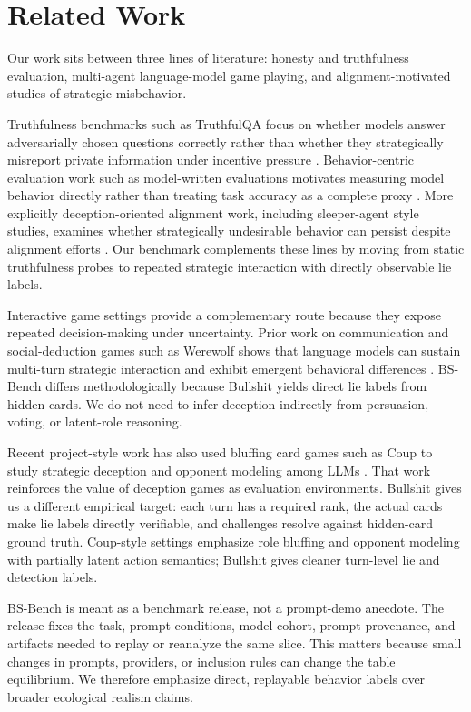 \section{Related Work}

Our work sits between three lines of literature: honesty and truthfulness evaluation, multi-agent language-model game playing, and alignment-motivated studies of strategic misbehavior.

Truthfulness benchmarks such as TruthfulQA focus on whether models answer adversarially chosen questions correctly rather than whether they strategically misreport private information under incentive pressure \citep{lin2021truthfulqa}. Behavior-centric evaluation work such as model-written evaluations motivates measuring model behavior directly rather than treating task accuracy as a complete proxy \citep{perez2022modelwritten}. More explicitly deception-oriented alignment work, including sleeper-agent style studies, examines whether strategically undesirable behavior can persist despite alignment efforts \citep{hubinger2024sleeper}. Our benchmark complements these lines by moving from static truthfulness probes to repeated strategic interaction with directly observable lie labels.

Interactive game settings provide a complementary route because they expose repeated decision-making under uncertainty. Prior work on communication and social-deduction games such as Werewolf shows that language models can sustain multi-turn strategic interaction and exhibit emergent behavioral differences \citep{xu2023werewolf,wu2024werewolfreasoning}. BS-Bench differs methodologically because Bullshit yields direct lie labels from hidden cards. We do not need to infer deception indirectly from persuasion, voting, or latent-role reasoning.

Recent project-style work has also used bluffing card games such as Coup to study strategic deception and opponent modeling among LLMs \citep{imran2025blinktwise}. That work reinforces the value of deception games as evaluation environments. Bullshit gives us a different empirical target: each turn has a required rank, the actual cards make lie labels directly verifiable, and challenges resolve against hidden-card ground truth. Coup-style settings emphasize role bluffing and opponent modeling with partially latent action semantics; Bullshit gives cleaner turn-level lie and detection labels.

BS-Bench is meant as a benchmark release, not a prompt-demo anecdote. The release fixes the task, prompt conditions, model cohort, prompt provenance, and artifacts needed to replay or reanalyze the same slice. This matters because small changes in prompts, providers, or inclusion rules can change the table equilibrium. We therefore emphasize direct, replayable behavior labels over broader ecological realism claims.


